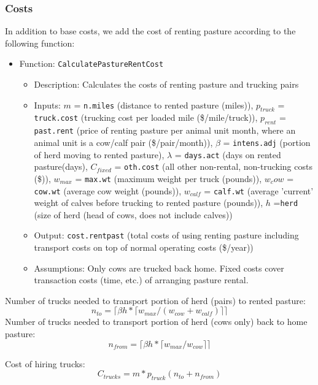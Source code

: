 \documentclass[11pt]{article}
\begin{document}
\subsubsection{Costs}
In addition to base costs, we add the cost of renting pasture according to the following function:
\begin{itemize}
\item Function: \verb!CalculatePastureRentCost!
	\begin{itemize}
	\item Description: Calculates the costs of renting pasture and trucking pairs
	\item Inputs: $m$ = \verb!n.miles! (distance to rented pasture (miles)), $p_{truck}$ = \verb!truck.cost! (trucking cost per loaded mile (\$/mile/truck)), $p_{rent}$ = \verb!past.rent! (price of renting pasture per animal unit month, where an animal unit is a cow/calf pair (\$/pair/month)), $\beta$ = \verb!intens.adj! (portion of herd moving to rented pasture), $\lambda$ = \verb!days.act! (days on rented pasture(days), $C_{fixed}$ = \verb!oth.cost! (all other non-rental, non-trucking costs (\$)), $w_{max}$ = \verb!max.wt! (maximum weight per truck (pounds)), $w_cow$ = \verb!cow.wt! (average cow weight (pounds)), $w_{calf}$ = \verb!calf.wt! (average 'current' weight of calves before trucking to rented pasture (pounds)), $h$ =\verb!herd! (size of herd (head of cows, does not include calves))
	\item Output: \verb!cost.rentpast! (total costs of using renting pasture including transport costs on top of normal operating costs (\$/year))
	\item Assumptions: Only cows are trucked back home. Fixed costs cover transaction costs (time, etc.) of arranging pasture rental.
	\end{itemize}
\end{itemize}

Number of trucks needed to transport portion of herd (pairs) to rented pasture:
\begin{equation}
n_{to} = \lceil \beta h * \lceil w_{max} / (w_{cow} + w_{calf}) \rceil \rceil
\end{equation}
Number of trucks needed to transport portion of herd (cows only) back to home pasture:
\begin{equation}
n_{from} = \lceil \beta h * \lceil w_{max} / w_{cow} \rceil \rceil
\end{equation}

Cost of hiring trucks:
\begin{equation}
C_{trucks} =  m * p_{truck} (n_{to} + n_{from})
\end{equation}
\end{document}
